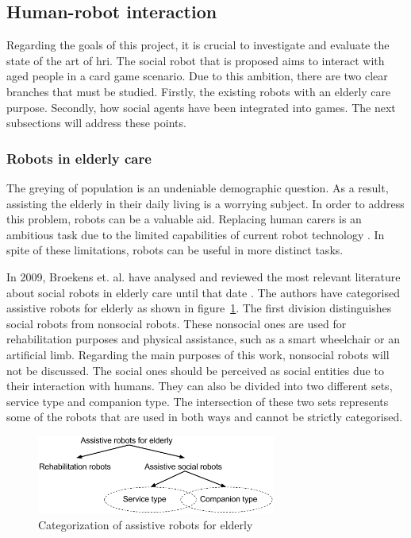 \subsection{Human-robot interaction}

Regarding the goals of this project, it is crucial to investigate and evaluate the state of the art of \gls{hri}.
The social robot that is proposed aims to interact with aged people in a card game scenario.
Due to this ambition, there are two clear branches that must be studied.
Firstly, the existing robots with an elderly care purpose.
Secondly, how social agents have been integrated into games.
The next subsections will address these points.



\subsubsection{Robots in elderly care}


The greying of population is an undeniable demographic question.
As a result, assisting the elderly in their daily living is a worrying subject.
In order to address this problem, robots can be a valuable aid.
Replacing human carers is an ambitious task due to the limited capabilities of current robot technology \cite{Walters2013}.
In spite of these limitations, robots can be useful in more distinct tasks.

In 2009, Broekens et. al. have analysed and reviewed the most relevant literature about social robots in elderly care until that date \cite{Broekens2009}.
The authors have categorised assistive robots for elderly as shown in figure~\ref{fig:categorization}.
The first division distinguishes social robots from nonsocial robots.
These nonsocial ones are used for rehabilitation purposes and physical assistance, such as a smart wheelchair or an artificial limb.
Regarding the main purposes of this work, nonsocial robots will not be discussed.
The social ones should be perceived as social entities due to their interaction with humans.
They can also be divided into two different sets, service type and companion type.
The intersection of these two sets represents some of the robots that are used in both ways and cannot be strictly categorised.

\begin{figure}[h!]
  \centering
    \includegraphics[width=0.7\textwidth]{./img/categorization_robots}
  \caption{Categorization of assistive robots for elderly}
\label{fig:categorization}
\end{figure}

